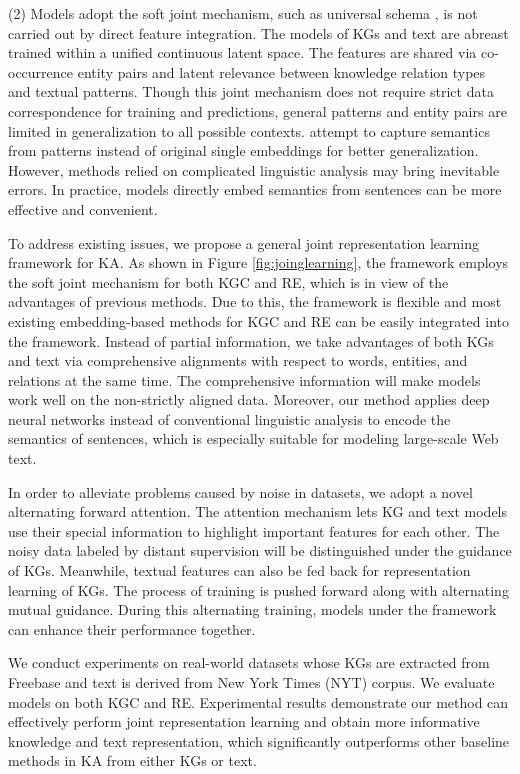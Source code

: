 \documentclass[letterpaper]{article} %
\begin{document}
(2) Models adopt the soft joint mechanism, such as universal schema \cite{riedel2013relation}, is not carried out by direct feature integration. The models of KGs and text are abreast trained within a unified continuous latent space. The features are shared via co-occurrence entity pairs and latent relevance between knowledge relation types and textual patterns. Though this joint mechanism does not require strict data correspondence for training and predictions, general patterns and entity pairs are limited in generalization to all possible contexts. \cite{vergaEtAl,vergamccallum} attempt to capture semantics from patterns instead of original single embeddings for better generalization. However, methods relied on complicated linguistic analysis may bring inevitable errors. In practice, models directly embed semantics from sentences can be more effective and convenient.
 
To address existing issues, we propose a general joint representation learning framework for KA. As shown in Figure \ref{fig:joinglearning}, the framework employs the soft joint mechanism for both KGC and RE, which is in view of the advantages of previous methods. Due to this, the framework is flexible and most existing embedding-based methods for KGC and RE can be easily integrated into the framework. Instead of partial information, we take advantages of both KGs and text via comprehensive alignments with respect to words, entities, and relations at the same time. The comprehensive information will make models work well on the non-strictly aligned data. Moreover, our method applies deep neural networks instead of conventional linguistic analysis to encode the semantics of sentences, which is especially suitable for modeling large-scale Web text. 

In order to alleviate problems caused by noise in datasets, we adopt a novel alternating forward attention. The attention mechanism lets KG and text models use their special information to highlight important features for each other. The noisy data labeled by distant supervision will be distinguished under the guidance of KGs. Meanwhile, textual features can also be fed back for representation learning of KGs. The process of training is pushed forward along with alternating mutual guidance. During this alternating training, models under the framework can enhance their performance together.

We conduct experiments on real-world datasets whose KGs are extracted from Freebase and text is derived from New York Times (NYT) corpus. We evaluate models on both KGC and RE. Experimental results demonstrate our method can effectively perform joint representation learning and obtain more informative knowledge and text representation, which significantly outperforms other baseline methods in KA from either KGs or text.
\end{document}
